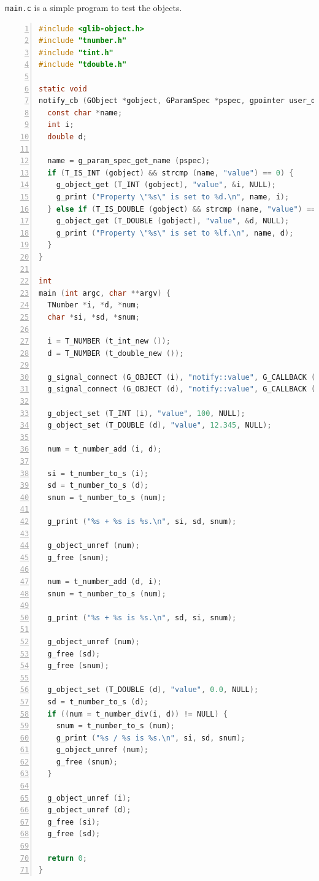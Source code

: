\passthrough{\lstinline!main.c!} is a simple program to test the
objects.

\begin{lstlisting}[language=C, numbers=left]
#include <glib-object.h>
#include "tnumber.h"
#include "tint.h"
#include "tdouble.h"

static void
notify_cb (GObject *gobject, GParamSpec *pspec, gpointer user_data) {
  const char *name;
  int i;
  double d;

  name = g_param_spec_get_name (pspec);
  if (T_IS_INT (gobject) && strcmp (name, "value") == 0) {
    g_object_get (T_INT (gobject), "value", &i, NULL);
    g_print ("Property \"%s\" is set to %d.\n", name, i);
  } else if (T_IS_DOUBLE (gobject) && strcmp (name, "value") == 0) {
    g_object_get (T_DOUBLE (gobject), "value", &d, NULL);
    g_print ("Property \"%s\" is set to %lf.\n", name, d);
  }
}

int
main (int argc, char **argv) {
  TNumber *i, *d, *num;
  char *si, *sd, *snum;

  i = T_NUMBER (t_int_new ());
  d = T_NUMBER (t_double_new ());

  g_signal_connect (G_OBJECT (i), "notify::value", G_CALLBACK (notify_cb), NULL);
  g_signal_connect (G_OBJECT (d), "notify::value", G_CALLBACK (notify_cb), NULL);

  g_object_set (T_INT (i), "value", 100, NULL);
  g_object_set (T_DOUBLE (d), "value", 12.345, NULL);

  num = t_number_add (i, d);

  si = t_number_to_s (i);
  sd = t_number_to_s (d);
  snum = t_number_to_s (num);

  g_print ("%s + %s is %s.\n", si, sd, snum);

  g_object_unref (num);
  g_free (snum);

  num = t_number_add (d, i);
  snum = t_number_to_s (num);

  g_print ("%s + %s is %s.\n", sd, si, snum);

  g_object_unref (num);
  g_free (sd);
  g_free (snum);

  g_object_set (T_DOUBLE (d), "value", 0.0, NULL);
  sd = t_number_to_s (d);
  if ((num = t_number_div(i, d)) != NULL) {
    snum = t_number_to_s (num);
    g_print ("%s / %s is %s.\n", si, sd, snum);
    g_object_unref (num);
    g_free (snum);
  }

  g_object_unref (i);
  g_object_unref (d);
  g_free (si);
  g_free (sd);

  return 0;
}
\end{lstlisting}

